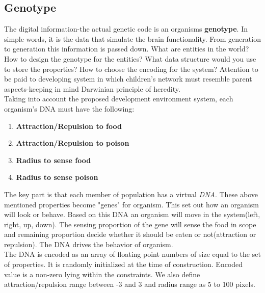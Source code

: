 \documentclass[conference]{IEEEtran}
\begin{document}
\subsection{Genotype}
The digital information-the actual genetic code is an organisms \textbf{genotype}. In simple words, it is the data that simulate the brain functionality. From generation to generation this information is passed down. What are entities in the world? How to design the genotype for the entities? What data structure would you use to store the properties? How to choose the encoding for the system? Attention to be paid to developing system in which children's network must resemble parent aspects-keeping in mind Darwinian principle of heredity.\\
Taking into account the proposed development environment system, each organism's DNA must have the following:
\begin{enumerate}
\item \textbf{Attraction/Repulsion to food}
\item \textbf{Attraction/Repulsion to poison}
\item \textbf{Radius to sense food}
\item \textbf{Radius to sense poison}
\end{enumerate}
The key part is that each member of population has a virtual \textit{DNA}. These above mentioned properties become "genes" for organism. This set out how an organism will look or behave. Based on this DNA an organism will move in the system(left, right, up, down). The sensing proportion of the gene will sense the food in scope and remaining proportion decide whether it should be eaten or not(attraction or repulsion). The DNA drives the behavior of organism.\\
The DNA is encoded as an array of floating point numbers of size equal to the set of properties. It is randomly initialized at the time of construction. Encoded value is a non-zero lying within the constraints. We also define attraction/repulsion range between -3 and 3 and radius range as 5 to 100 pixels.
\end{document}

